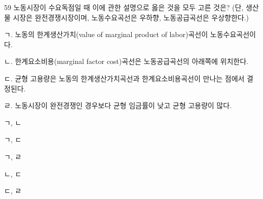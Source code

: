 \begin{question}{59}
노동시장이 수요독점일 때 이에 관한 설명으로 옳은 것을 모두 고른 것은? (단, 생산물 시장은 완전경쟁시장이며, 노동수요곡선은 우하향, 노동공급곡선은 우상향한다.)
\begin{framedtext}
ㄱ. 노동의 한계생산가치(value of marginal product of labor)곡선이 노동수요곡선이다. \par
ㄴ. 한계요소비용(marginal factor cost)곡선은 노동공급곡선의 아래쪽에 위치한다. \par
ㄷ. 균형 고용량은 노동의 한계생산가치곡선과 한계요소비용곡선이 만나는 점에서 결정된다. \par
ㄹ. 노동시장이 완전경쟁인 경우보다 균형 임금률이 낮고 균형 고용량이 많다.
\end{framedtext}
\begin{choices}
  \item ㄱ, ㄴ
  \item ㄱ, ㄷ
  \item ㄱ, ㄹ
  \item ㄴ, ㄷ
  \item ㄷ, ㄹ
\end{choices}
\end{question}
